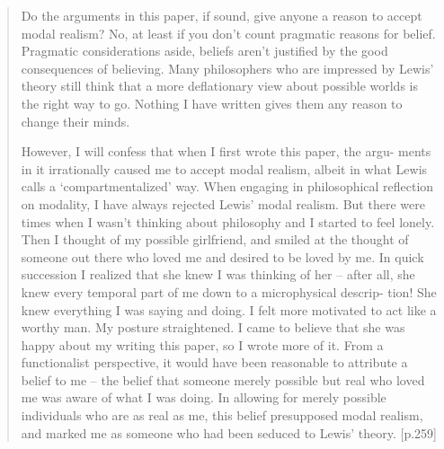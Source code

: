 \documentclass[
10pt, %
a4paper, %
twocolumn, %
landscape %
]{article}
\begin{document}
\begin{quote}
  Do the arguments in this paper, if sound, give anyone a reason to accept modal realism? No, at least if you don't count pragmatic reasons for belief. Pragmatic considerations aside, beliefs aren't justified by the good consequences of believing. Many philosophers who are impressed by Lewis' theory still think that a more deflationary view about possible worlds is the right way to go. Nothing I have written gives them any reason to change their minds.

  However, I will confess that when I first wrote this paper, the argu- ments in it irrationally caused me to accept modal realism, albeit in what Lewis calls a `compartmentalized' way.
  When engaging in philosophical
  reflection on modality, I have always rejected Lewis' modal realism. But there were times when I wasn't thinking about philosophy and I started to feel lonely. Then I thought of my possible girlfriend, and smiled at the thought of someone out there who loved me and desired to be loved by me. In quick succession I realized that she knew I was thinking of her -- after all, she knew every temporal part of me down to a microphysical descrip- tion! She knew everything I was saying and doing. I felt more motivated to act like a worthy man. My posture straightened. I came to believe that she was happy about my writing this paper, so I wrote more of it. From a functionalist perspective, it would have been reasonable to attribute a belief to me -- the belief that someone merely possible but real who loved me was aware of what I was doing. In allowing for merely possible individuals who are as real as me, this belief presupposed modal realism, and marked me as someone who had been seduced to Lewis' theory.
  [p.259]
\end{quote}




\end{document}
